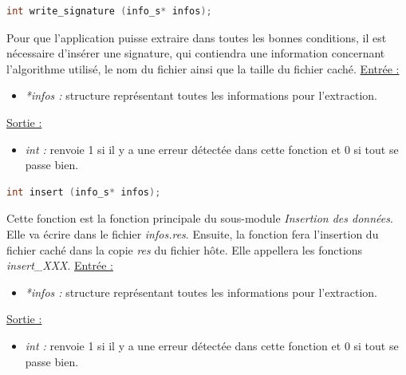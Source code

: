 \documentclass[11pt]{article}
\begin{document}
\begin{lstlisting}[language=c]
int write_signature (info_s* infos); 
\end{lstlisting}

Pour que l'application puisse extraire dans toutes les bonnes conditions, 
il est nécessaire d'insérer une signature, qui contiendra une information
concernant l'algorithme utilisé, le nom du fichier ainsi que la taille du 
fichier caché. 
\newline
\underline{Entrée :} 
\begin{itemize}
\item \textit{*infos :} structure représentant toutes les informations pour 
l'extraction. 
\end{itemize}
\underline{Sortie :} 
\begin{itemize}
\item \textit{int :} renvoie 1 si il y a une erreur détectée dans cette 
fonction et 0 si tout se passe bien.  
\newline 
\end{itemize}



\begin{lstlisting}[language=c]
int insert (info_s* infos); 
\end{lstlisting}

Cette fonction est la fonction principale du sous-module 
\textit{Insertion des données}. 
Elle va écrire dans le fichier \textit{infos.res}. 
Ensuite, la fonction fera l'insertion du fichier caché dans la copie 
\textit{res} du fichier hôte. 
Elle appellera les fonctions \textit{insert\_XXX}. 
\newline
\underline{Entrée :} 
\begin{itemize}
\item \textit{*infos :} structure représentant toutes les informations pour 
l'extraction. 
\end{itemize}
\underline{Sortie :} 
\begin{itemize}
\item \textit{int :} renvoie 1 si il y a une erreur détectée dans cette 
fonction et 0 si tout se passe bien.  
\newline 
\end{itemize}
\end{document}
